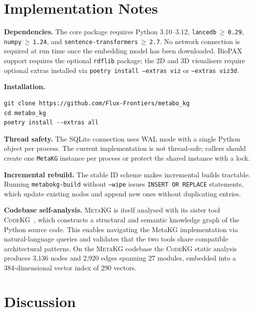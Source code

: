 \documentclass[10pt]{article}
\begin{document}
\section{Implementation Notes}
\label{sec:impl}

\textbf{Dependencies.} The core package requires Python 3.10--3.12,
\texttt{lancedb$\,\geq\,$0.29}, \texttt{numpy$\,\geq\,$1.24}, and
\texttt{sentence-transformers$\,\geq\,$2.7}. No network connection is required
at run time once the embedding model has been downloaded. BioPAX support
requires the optional \texttt{rdflib} package; the 2D and 3D visualisers
require optional extras installed via \texttt{poetry install --extras viz}
or \texttt{--extras viz3d}.

\textbf{Installation.}

\begin{lstlisting}[style=bash]
git clone https://github.com/Flux-Frontiers/metabo_kg
cd metabo_kg
poetry install --extras all
\end{lstlisting}

\textbf{Thread safety.} The SQLite connection uses WAL mode with a single
Python object per process. The current implementation is not thread-safe;
callers should create one \texttt{MetaKG} instance per process or protect
the shared instance with a lock.

\textbf{Incremental rebuild.} The stable ID scheme makes incremental builds
tractable. Running \texttt{metabokg-build} without \texttt{--wipe} issues
\texttt{INSERT OR REPLACE} statements, which update existing nodes and append
new ones without duplicating entries.

\textbf{Codebase self-analysis.} \textsc{MetaKG} is itself analysed with its
sister tool \textsc{CodeKG}~\citep{fluxfrontiers2025codekg}, which constructs
a structural and semantic knowledge graph of the Python source code.
This enables navigating the MetaKG implementation via natural-language queries
and validates that the two tools share compatible architectural patterns.
On the \textsc{MetaKG} codebase the \textsc{CodeKG} static analysis produces
3,136 nodes and 2,920 edges spanning 27 modules, embedded into a
384-dimensional vector index of 290 vectors.

\section{Discussion}
\label{sec:discussion}
\end{document}
